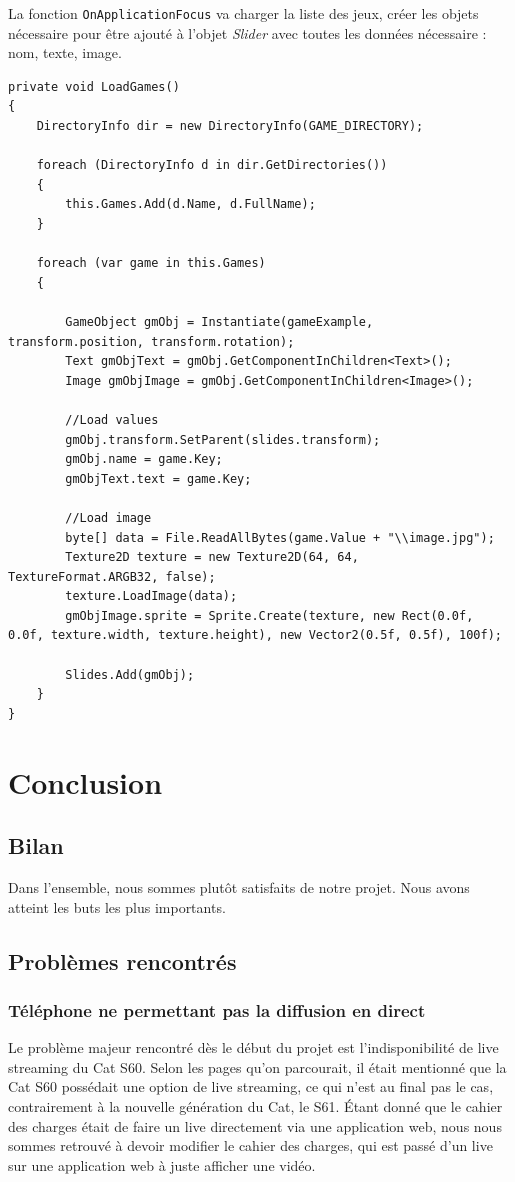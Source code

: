 \documentclass[12pt]{article}
\begin{document}
La fonction \texttt{OnApplicationFocus} va charger la liste des jeux, créer les objets nécessaire pour être ajouté à l'objet \textit{Slider} avec toutes les données nécessaire : nom, texte, image.
\begin{lstlisting}
private void LoadGames()
{
    DirectoryInfo dir = new DirectoryInfo(GAME_DIRECTORY);

    foreach (DirectoryInfo d in dir.GetDirectories())
    {
        this.Games.Add(d.Name, d.FullName);
    }

    foreach (var game in this.Games)
    {

        GameObject gmObj = Instantiate(gameExample, transform.position, transform.rotation);
        Text gmObjText = gmObj.GetComponentInChildren<Text>();
        Image gmObjImage = gmObj.GetComponentInChildren<Image>();
        
        //Load values
        gmObj.transform.SetParent(slides.transform);
        gmObj.name = game.Key;
        gmObjText.text = game.Key;

        //Load image
        byte[] data = File.ReadAllBytes(game.Value + "\\image.jpg");
        Texture2D texture = new Texture2D(64, 64, TextureFormat.ARGB32, false);
        texture.LoadImage(data);
        gmObjImage.sprite = Sprite.Create(texture, new Rect(0.0f, 0.0f, texture.width, texture.height), new Vector2(0.5f, 0.5f), 100f);

        Slides.Add(gmObj);
    }
}
\end{lstlisting}

\section{Conclusion}
\subsection{Bilan}
Dans l’ensemble, nous sommes plutôt satisfaits de notre projet. Nous avons atteint les buts les plus importants.
\subsection{Problèmes rencontrés}
\subsubsection{Téléphone ne permettant pas la diffusion en direct}
Le problème majeur rencontré dès le début du projet est l’indisponibilité de live streaming du Cat S60. Selon les pages qu’on parcourait, il était mentionné que la Cat S60 possédait une option de live streaming, ce qui n’est au final pas le cas, contrairement à la nouvelle génération du Cat, le S61. Étant donné que le cahier des charges était de faire un live directement via une application web, nous nous sommes retrouvé à devoir modifier le cahier des charges, qui est passé d’un live sur une application web à juste afficher une vidéo.
\end{document}
